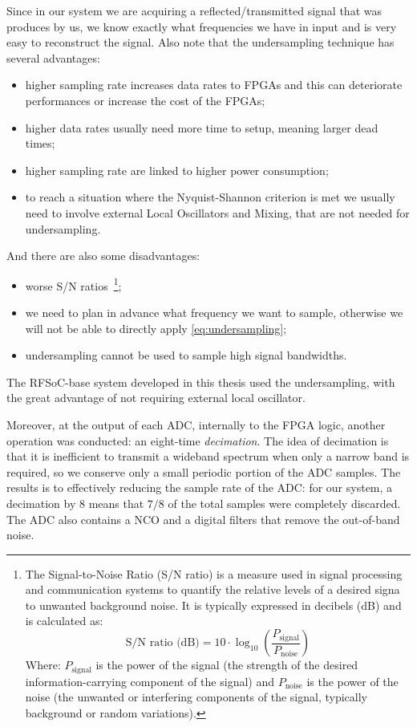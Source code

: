Since in our system we are acquiring a reflected/transmitted signal that was produces by us, we know exactly what frequencies we have in input and is very easy to reconstruct the signal.
Also note that the undersampling technique has several advantages:
\begin{itemize}
    \item higher sampling rate increases data rates to FPGAs and this can deteriorate performances or increase the cost of the FPGAs;
    \item higher data rates usually need more time to setup, meaning larger dead times;
    \item higher sampling rate are linked to higher power consumption;
    \item to reach a situation where the Nyquist-Shannon criterion is met we usually need to involve external Local Oscillators and Mixing, that are not needed for undersampling.
\end{itemize}

And there are also some disadvantages:
\begin{itemize}
    \item worse S/N ratios~\footnote{The Signal-to-Noise Ratio (S/N ratio) is a measure used in signal processing and communication systems to quantify the relative levels of a desired signa to unwanted background noise. It is typically expressed in decibels (dB) and is calculated as: \[ \text{S/N ratio (dB)} = 10 \cdot \log_{10}\left(\frac{P_{\text{signal}}}{P_{\text{noise}}}\right) \] Where: \(P_{\text{signal}}\) is the power of the signal (the strength of the desired information-carrying component of the signal) and \(P_{\text{noise}}\) is the power of the noise (the unwanted or interfering components of the signal, typically background or random variations).};
    \item we need to plan in advance what frequency we want to sample, otherwise we will not be able to directly apply \cref{eq:undersampling};
    \item undersampling cannot be used to sample high signal bandwidths.
\end{itemize}

The RFSoC-base system developed in this thesis used the undersampling, with the great advantage of not requiring external local oscillator.

Moreover, at the output of each ADC, internally to the FPGA logic, another operation was conducted: an eight-time \textit{decimation}.
The idea of decimation is that it is inefficient to transmit a wideband spectrum when only a narrow band is required, so we conserve only a small periodic portion of the ADC samples.
The results is to effectively reducing the sample rate of the ADC: for our system, a decimation by 8 means that $7/8$ of the total samples were completely discarded.\\
The ADC also contains a NCO and a digital filters that remove the out-of-band noise.

